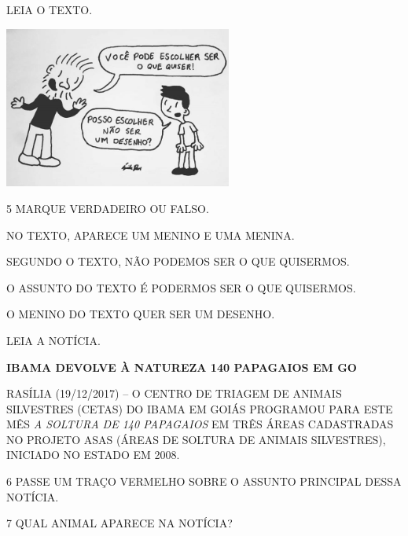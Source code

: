 
LEIA O TEXTO.

\includegraphics[width=2.95254in,height=2.09138in]{media/image164.jpg}


\num{5} MARQUE VERDADEIRO OU FALSO.

\begin{boxlist}
\item NO TEXTO, APARECE UM MENINO E UMA MENINA.

\item SEGUNDO O TEXTO, NÃO PODEMOS SER O QUE QUISERMOS.

\item O ASSUNTO DO TEXTO É PODERMOS SER O QUE QUISERMOS.

\item O MENINO DO TEXTO QUER SER UM DESENHO.
\end{boxlist}

LEIA A NOTÍCIA.

\textbf{IBAMA DEVOLVE À NATUREZA 140 PAPAGAIOS EM GO}

RASÍLIA (19/12/2017) -- O CENTRO DE TRIAGEM DE ANIMAIS SILVESTRES
(CETAS) DO IBAMA EM GOIÁS PROGRAMOU PARA ESTE MÊS \emph{A SOLTURA DE 140
PAPAGAIOS} EM TRÊS ÁREAS CADASTRADAS NO PROJETO ASAS (ÁREAS DE SOLTURA
DE ANIMAIS SILVESTRES), INICIADO NO ESTADO EM 2008.~


\num{6} PASSE UM TRAÇO VERMELHO SOBRE O ASSUNTO PRINCIPAL DESSA NOTÍCIA.

\num{7} QUAL ANIMAL APARECE NA NOTÍCIA?


